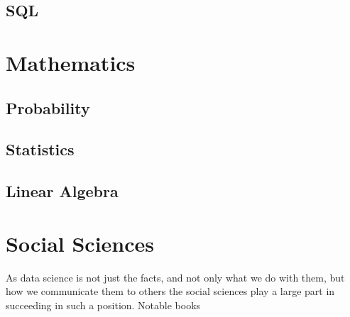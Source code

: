 \documentclass[11pt,letterpaper,oneside]{memoir}
\theoremstyle{definition}
\begin{document}
\section{SQL}
\chapter{Mathematics}
\section{Probability}
\section{Statistics}
\section{Linear Algebra}
\chapter{Social Sciences}
As data science is not just the facts, and not only what we do with them, but
how we communicate them to others the social sciences play a large part in
succeeding in such a position.  Notable books 

\printnoidxglossaries

\end{document}
